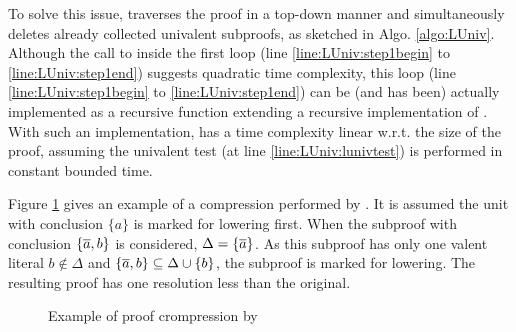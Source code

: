 \documentclass{llncs}
\begin{document}
To solve this issue, {\LowerUnivalents} traverses the proof in a top-down manner and simultaneously
deletes already collected univalent subproofs, as sketched in Algo. \ref{algo:LUniv}.  Although the
call to  inside the first loop (line \ref{line:LUniv:step1begin} to
\ref{line:LUniv:step1end}) suggests quadratic time complexity, this loop (line
\ref{line:LUniv:step1begin} to \ref{line:LUniv:step1end}) can be (and has been) actually implemented
as a recursive function extending a recursive implementation of . With such an
implementation, {\LowerUnivalents} has a time complexity linear w.r.t. the size of the proof, assuming the
univalent test (at line \ref{line:LUniv:lunivtest}) is performed in constant bounded time. 


Figure \ref{fig:exluniv} gives an example of a compression performed by \LowerUnivalents. It is
assumed the unit with conclusion $\{a\}$ is marked for lowering first. When the subproof with
conclusion $\{\overline{a},b\}$ is considered, $\Delta = \{\overline{a}\}$. As this subproof has only one
valent literal $b \notin \Delta$ and $\{\overline{a},b\} \subseteq \Delta \cup \{b\}$, the subproof is
marked for lowering. The resulting proof has one resolution less than the original.

\begin{figure}[htb]
  \centering
   \qquad
  \centering
  \caption{Example of proof crompression by \LowerUnivalents} \label{fig:exluniv}
\end{figure}
\end{document}
